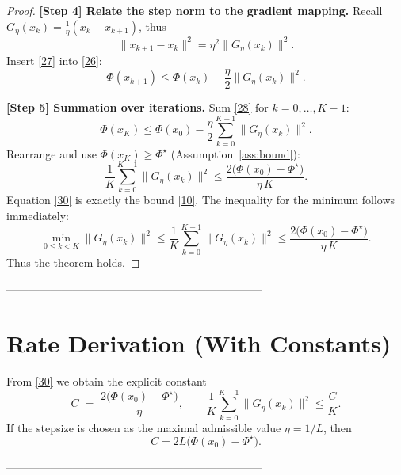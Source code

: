 \documentclass{article}
\begin{document}
\begin{proof}
\noindent\textbf{[Step 4] Relate the step norm to the gradient mapping.}  
Recall $G_{\eta}(x_k)=\frac{1}{\eta}(x_k-x_{k+1})$, thus
\[
\|x_{k+1}-x_k\|^{2}=\eta^{2}\|G_{\eta}(x_k)\|^{2}.
\tag{27}
\]
Insert \eqref{27} into \eqref{26}:
\[
\Phi(x_{k+1})\le\Phi(x_k)-\frac{\eta}{2}\|G_{\eta}(x_k)\|^{2}.
\tag{28}
\]

\noindent\textbf{[Step 5] Summation over iterations.}  
Sum \eqref{28} for $k=0,\dots,K-1$:
\[
\Phi(x_K)\le\Phi(x_0)-\frac{\eta}{2}\sum_{k=0}^{K-1}\|G_{\eta}(x_k)\|^{2}.
\tag{29}
\]
Rearrange and use $\Phi(x_K)\ge\Phi^\star$ (Assumption~\ref{ass:bound}):
\[
\frac{1}{K}\sum_{k=0}^{K-1}\|G_{\eta}(x_k)\|^{2}
\le\frac{2\bigl(\Phi(x_0)-\Phi^\star\bigr)}{\eta\,K}.
\tag{30}
\]
Equation \eqref{30} is exactly the bound \eqref{10}. The inequality for the minimum follows immediately:
\[
\min_{0\le k<K}\|G_{\eta}(x_k)\|^{2}
\le\frac{1}{K}\sum_{k=0}^{K-1}\|G_{\eta}(x_k)\|^{2}
\le\frac{2\bigl(\Phi(x_0)-\Phi^\star\bigr)}{\eta\,K}.
\tag{31}
\]
Thus the theorem holds. \qedhere
\end{proof}

---------------------------------------------------------------------

\section*{Rate Derivation (With Constants)}
From \eqref{30} we obtain the explicit constant
\[
C\;=\;\frac{2\bigl(\Phi(x_0)-\Phi^\star\bigr)}{\eta},
\qquad
\frac{1}{K}\sum_{k=0}^{K-1}\|G_{\eta}(x_k)\|^{2}\le\frac{C}{K}.
\tag{32}
\]
If the stepsize is chosen as the maximal admissible value $\eta=1/L$, then
\[
C = 2L\bigl(\Phi(x_0)-\Phi^\star\bigr).
\tag{33}
\]

---------------------------------------------------------------------
\end{document}

